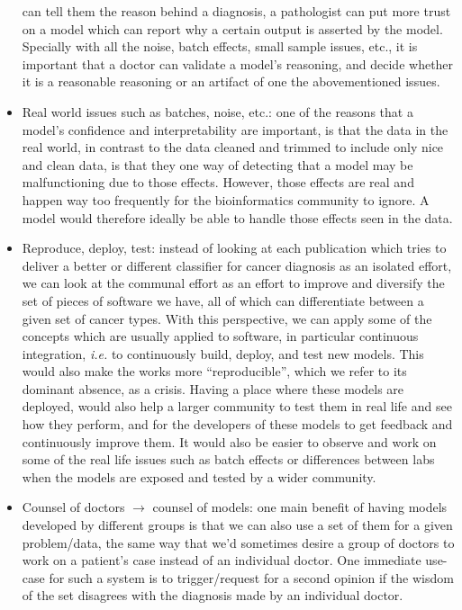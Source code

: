\begin{itemize}
    can tell them the reason behind a diagnosis, a pathologist can put more
    trust on a model which can report why a certain output is asserted by the
    model. Specially with all the noise, batch effects, small sample issues,
    etc., it is important that a doctor can validate a model's reasoning, and
    decide whether it is a reasonable reasoning or an artifact of one the
    abovementioned issues.
  \item Real world issues such as batches, noise, etc.: one of the reasons that
    a model's confidence and interpretability are important, is that the data
    in the real world, in contrast to the data cleaned and trimmed to include
    only nice and clean data, is that they one way of detecting that a model
    may be malfunctioning due to those effects. However, those effects are real
    and happen way too frequently for the bioinformatics community to ignore. A
    model would therefore ideally be able to handle those effects seen in the
    data.
  \item Reproduce, deploy, test: instead of looking at each publication which
    tries to deliver a better or different classifier for cancer diagnosis as
    an isolated effort, we can look at the communal effort as an effort to
    improve and diversify the set of pieces of software we have, all of which
    can differentiate between a given set of cancer types. With this
    perspective, we can apply some of the concepts which are usually applied to
    software, in particular continuous integration, \emph{i.e.} to continuously
    build, deploy, and test new models. This would also make the works more
    ``reproducible'', which we refer to its dominant absence, as a crisis.
    Having a place where these models are deployed, would also help a larger
    community to test them in real life and see how they perform, and for the
    developers of these models to get feedback and continuously improve them.
    It would also be easier to observe and work on some of the real life issues
    such as batch effects or differences between labs when the models are
    exposed and tested by a wider community.
  \item Counsel of doctors $\rightarrow$ counsel of models: one main benefit of
    having models developed by different groups is that we can also use a set
    of them for a given problem/data, the same way that we'd sometimes desire a
    group of doctors to work on a patient's case instead of an individual
    doctor. One immediate use-case for such a system is to trigger/request for
    a second opinion if the wisdom of the set disagrees with the diagnosis made
    by an individual doctor.
\end{itemize}
